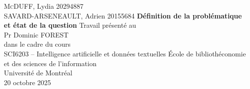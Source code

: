 \begin{titlepage}
    \begin{center}
        M\textsc{c}DUFF, Lydia \hfill
        20294887\\
        SAVARD-ARSENEAULT, Adrien \hfill
        20155684
        \vfill
        \textbf{Définition de la problématique et état de la question}
        \vfill
        Travail présenté au\\
        Pr Dominic FOREST\\
        \vspace*{1.5cm}
        dans le cadre du cours\\
        SCI6203 -- Intelligence artificielle et données textuelles
        \vfill
        École de bibliothéconomie et des sciences de l'information\\
        Université de Montréal\\
        20 octobre 2025
    \end{center}
\end{titlepage}